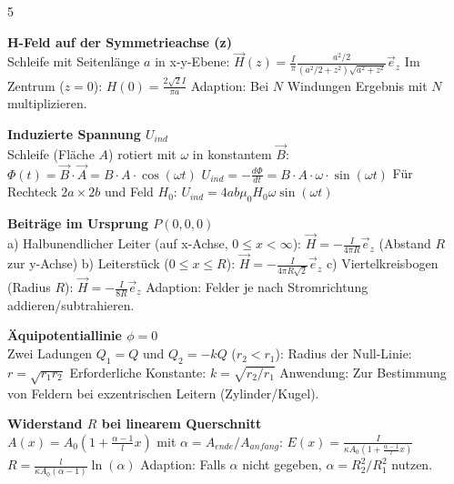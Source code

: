 \documentclass[a4paper, 2pt, landscape]{extarticle}
\begin{document}
\begin{multicols*}{5}
\begin{tcolorbox}[title={Magnetostatik: Quadratische Schleife (Blatt 8)}, colback=white, colframe=black]
\textbf{H-Feld auf der Symmetrieachse (z)} \\
Schleife mit Seitenlänge $a$ in x-y-Ebene:
$\vec{H}(z) = \frac{I}{\pi} \frac{a^2/2}{(a^2/2+z^2)\sqrt{a^2+z^2}} \vec{e}_z$
Im Zentrum ($z=0$): $H(0) = \frac{2\sqrt{2}I}{\pi a}$
Adaption: Bei $N$ Windungen Ergebnis mit $N$ multiplizieren.
\end{tcolorbox}

\begin{tcolorbox}[title={Induktion: Rotierende Leiterschleife (Blatt 7)}, colback=white, colframe=black]
\textbf{Induzierte Spannung $U_{ind}$} \\
Schleife (Fläche $A$) rotiert mit $\omega$ in konstantem $\vec{B}$:
$\Phi(t) = \vec{B} \cdot \vec{A} = B \cdot A \cdot \cos(\omega t)$
$U_{ind} = -\frac{d\Phi}{dt} = B \cdot A \cdot \omega \cdot \sin(\omega t)$
Für Rechteck $2a \times 2b$ und Feld $H_0$:
$U_{ind} = 4ab \mu_0 H_0 \omega \sin(\omega t)$
\end{tcolorbox}

\begin{tcolorbox}[title={Magnetostatik: Biot-Savart Segmente (Blatt 6)}, colback=white, colframe=black]
\textbf{Beiträge im Ursprung $P(0,0,0)$} \\
a) Halbunendlicher Leiter (auf x-Achse, $0 \le x < \infty$):
$\vec{H} = -\frac{I}{4\pi R} \vec{e}_z$ (Abstand $R$ zur y-Achse)
b) Leiterstück ($0 \le x \le R$):
$\vec{H} = -\frac{I}{4\pi R \sqrt{2}} \vec{e}_z$
c) Viertelkreisbogen (Radius $R$):
$\vec{H} = -\frac{I}{8 R} \vec{e}_z$
Adaption: Felder je nach Stromrichtung addieren/subtrahieren.
\end{tcolorbox}

\begin{tcolorbox}[title={Elektrostatik: Punktladungen (Blatt 3)}, colback=white, colframe=black]
\textbf{Äquipotentiallinie $\phi=0$} \\
Zwei Ladungen $Q_1=Q$ und $Q_2=-kQ$ ($r_2 < r_1$):
Radius der Null-Linie: $r = \sqrt{r_1 r_2}$
Erforderliche Konstante: $k = \sqrt{r_2 / r_1}$
Anwendung: Zur Bestimmung von Feldern bei
exzentrischen Leitern (Zylinder/Kugel).
\end{tcolorbox}

\begin{tcolorbox}[title={Strömungsfeld: Kegelstumpf (Blatt 5)}, colback=white, colframe=black]
\textbf{Widerstand $R$ bei linearem Querschnitt} \\
$A(x) = A_0 (1 + \frac{\alpha - 1}{l} x)$ mit $\alpha = A_{ende}/A_{anfang}$:
$E(x) = \frac{I}{\kappa A_0 (1 + \frac{\alpha - 1}{l} x)}$
$R = \frac{l}{\kappa A_0 (\alpha - 1)} \ln(\alpha)$
Adaption: Falls $\alpha$ nicht gegeben, $\alpha = R_2^2/R_1^2$ nutzen.
\end{tcolorbox}


\end{multicols*}
\end{document}
